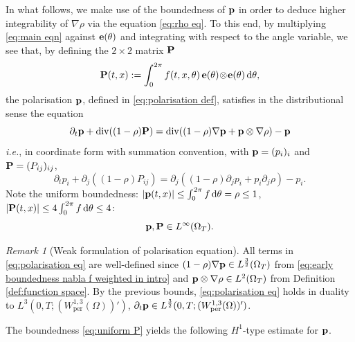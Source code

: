\documentclass[11pt,a4paper,reqno]{amsart}
\theoremstyle{remark}
\newtheorem{rem}[prop]{Remark}
\theoremstyle{definition}
\numberwithin{equation}{section}
\newcommand{\per}{\mathrm{per}}
\DeclareMathOperator{\dv}{div}
\renewcommand{\P}{{\bf P}}
\newcommand{\p}{{\bf p}}
\newcommand{\e}{{\bf e}}
\renewcommand{\d}{\, \mathrm{d} }
\begin{document}
In what follows, we make use of the boundedness of $\p$ in order to deduce higher integrability of $\nabla\rho$ via the equation \eqref{eq:rho eq}. To this end, by multiplying \eqref{eq:main eqn} against $\e(\theta)$ and integrating with respect to the angle variable, we see that, by defining the $2\times 2$ matrix $\P$ 
\begin{equation}\label{eq:P matrix def}
    \P(t,x) := \int_0^{2\pi} f(t,x,\theta) \, \e(\theta)\!\otimes\!\e(\theta) \d \theta, 
\end{equation}
the polarisation $\p$, defined in \eqref{eq:polarisation def}, satisfies in the distributional sense the equation 
\begin{equation}\label{eq:polarisation eq}
    \partial_t \p + \dv((1-\rho)\P) = \dv((1-\rho)\nabla \p + \p \otimes \nabla \rho) - \p 
\end{equation}
\textit{i.e.}, in coordinate form with summation convention, with $\p = (p_i)_{i}$ and $\P = (P_{ij})_{ij}$, 
\begin{equation}\label{eq:polarisation eq coord form}
    \partial_t p_i + \partial_j((1-\rho)P_{ij}) = \partial_j((1-\rho)\partial_j p_i + p_i \partial_j \rho) - p_i. 
\end{equation}
Note the uniform boundedness: $|\p(t,x)| \leq \int_0^{2\pi} f \d \theta = \rho \leq 1$, $|\P(t,x)| \leq 4 \int_0^{2\pi} f \d \theta \leq 4$: 
\begin{equation}\label{eq:uniform P}
    \p,\P \in L^\infty(\Omega_T). 
\end{equation}


\begin{rem}[Weak formulation of polarisation equation]\label{rem:sense of p eqn to begin with}
    All terms in \eqref{eq:polarisation eq} are well-defined since $(1-\rho)\nabla \p \in L^{\frac{3}{2}}(\Omega_T)$ from \eqref{eq:early boundedness nabla f weighted in intro} and $\p \otimes \nabla \rho \in L^2(\Omega_T)$ from Definition \ref{def:function space}. By the previous bounds, \eqref{eq:polarisation eq} holds in duality to $L^3(0,T;(W^{1,3}_\per(\Omega))')$, $\partial_t \p \in L^{\frac{3}{2}}(0,T;(W^{1,3}_\per(\Omega))')$. 
\end{rem}


The boundedness \eqref{eq:uniform P} yields the following $H^1$-type estimate for $\p$. 
\end{document}
